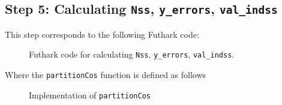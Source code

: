 \subsection{
  Step 5: Calculating \texttt{Nss}, \texttt{y\_errors}, \texttt{val\_indss}
}
This step corresponds to the following Futhark code:
\begin{figure}[H]
    \centering
    \caption{Futhark code for calculating \texttt{Nss}, \texttt{y\_errors}, \texttt{val\_indss}.}
    \label{fut:kernel5}
\end{figure}

Where the \texttt{partitionCos} function is defined as follows
\begin{figure}[H]
    \centering
    \caption{Implementation of \texttt{partitionCos}}
    \label{fut:partitionCos}
\end{figure}



